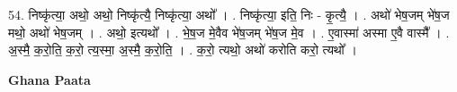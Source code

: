 \documentclass[17pt]{extarticle}
\begin{document}
54. निष्कृ॑त्या॒ अथो॒ अथो॒ निष्कृ॑त्यै॒ निष्कृ॑त्या॒ अथो᳚ । . निष्कृ॑त्या॒ इति॒ निः - कृ॒त्यै॒ । . अथो॑ भेष॒जम् भे॑ष॒ज मथो॒ अथो॑ भेष॒जम् । . अथो॒ इत्यथो᳚ । . भे॒ष॒ज मे॒वैव भे॑ष॒जम् भे॑ष॒ज मे॒व । . ए॒वास्मा॑ अस्मा ए॒वै वास्मै᳚ । . अ॒स्मै॒ क॒रो॒ति॒ क॒रो॒ त्य॒स्मा॒ अ॒स्मै॒ क॒रो॒ति॒ । . क॒रो॒ त्यथो॒ अथो॑ करोति करो॒ त्यथो᳚ । \newline

\textbf{Ghana Paata } \newline
\end{document}
